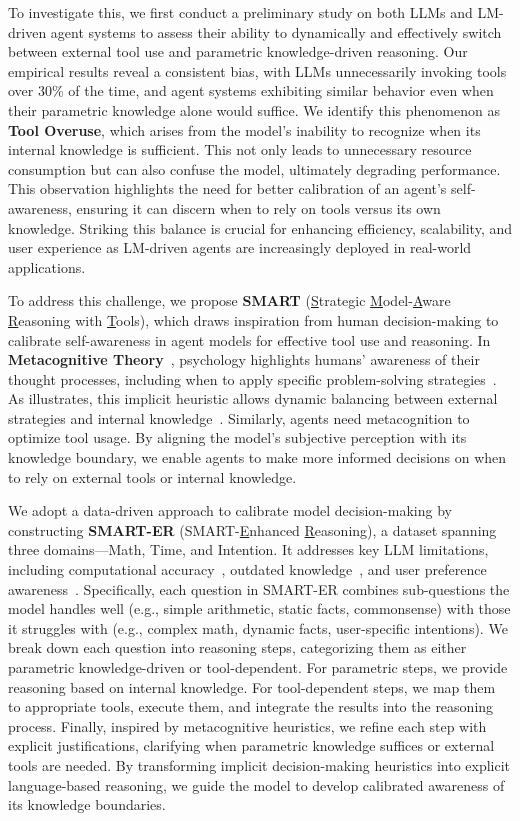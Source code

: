To investigate this, we first conduct a preliminary study on both LLMs and LM-driven agent systems to assess their ability to dynamically and effectively switch between external tool use and parametric knowledge-driven reasoning. Our empirical results reveal a consistent bias, with LLMs unnecessarily invoking tools over 30\% of the time, and agent systems exhibiting similar behavior even when their parametric knowledge alone would suffice. We identify this phenomenon as \textbf{Tool Overuse}, which arises from the model's inability to recognize when its internal knowledge is sufficient. This not only leads to unnecessary resource consumption but can also confuse the model, ultimately degrading performance. This observation highlights the need for better calibration of an agent’s self-awareness, ensuring it can discern when to rely on tools versus its own knowledge. Striking this balance is crucial for enhancing efficiency, scalability, and user experience as LM-driven agents are increasingly deployed in real-world applications.

To address this challenge, we propose \textbf{SMART} (\uline{S}trategic \uline{M}odel-\uline{A}ware \uline{R}easoning with \uline{T}ools), which draws inspiration from human decision-making to calibrate self-awareness in agent models for effective tool use and reasoning. In \textbf{Metacognitive Theory}~\citep{schraw1995metacognitive}, psychology highlights humans’ awareness of their thought processes, including when to apply specific problem-solving strategies~\citep{livingston2003metacognition}. As  illustrates, this implicit heuristic allows dynamic balancing between external strategies and internal knowledge~\citep{Minsky1986-MINTSO}. Similarly, agents need metacognition to optimize tool usage. By aligning the model’s subjective perception with its knowledge boundary, we enable agents to make more informed decisions on when to rely on external tools or internal knowledge.

We adopt a data-driven approach to calibrate model decision-making by constructing \textbf{SMART-ER} (SMART-\uline{E}nhanced \uline{R}easoning), a dataset spanning three domains—Math, Time, and Intention. It addresses key LLM limitations, including computational accuracy~\citep{hendrycks2021measuring}, outdated knowledge~\citep{vu2023freshllms}, and user preference awareness~\citep{qian2024tell}. Specifically, each question in SMART-ER combines sub-questions the model handles well (e.g., simple arithmetic, static facts, commonsense) with those it struggles with (e.g., complex math, dynamic facts, user-specific intentions).
We break down each question into reasoning steps, categorizing them as either parametric knowledge-driven or tool-dependent. For parametric steps, we provide reasoning based on internal knowledge. For tool-dependent steps, we map them to appropriate tools, execute them, and integrate the results into the reasoning process.
Finally, inspired by metacognitive heuristics, we refine each step with explicit justifications, clarifying when parametric knowledge suffices or external tools are needed. By transforming implicit decision-making heuristics into explicit language-based reasoning, we guide the model to develop calibrated awareness of its knowledge boundaries.

